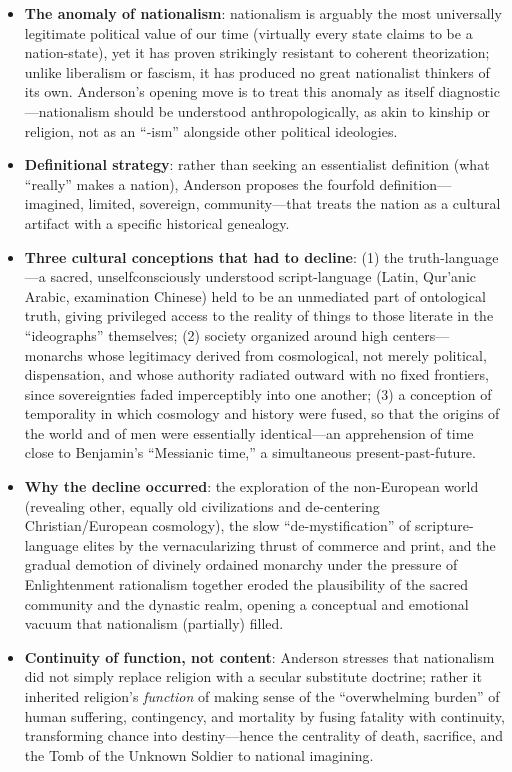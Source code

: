\documentclass[12pt]{article}
\begin{document}
\begin{itemize}[leftmargin=*, itemsep=4pt]
    \item \textbf{The anomaly of nationalism}: nationalism is arguably the most universally legitimate political value of our time (virtually every state claims to be a nation-state), yet it has proven strikingly resistant to coherent theorization; unlike liberalism or fascism, it has produced no great nationalist thinkers of its own. Anderson's opening move is to treat this anomaly as itself diagnostic---nationalism should be understood anthropologically, as akin to kinship or religion, not as an ``-ism'' alongside other political ideologies.
    \item \textbf{Definitional strategy}: rather than seeking an essentialist definition (what ``really'' makes a nation), Anderson proposes the fourfold definition---imagined, limited, sovereign, community---that treats the nation as a cultural artifact with a specific historical genealogy.
    \item \textbf{Three cultural conceptions that had to decline}: (1) the truth-language---a sacred, unselfconsciously understood script-language (Latin, Qur'anic Arabic, examination Chinese) held to be an unmediated part of ontological truth, giving privileged access to the reality of things to those literate in the ``ideographs'' themselves; (2) society organized around high centers---monarchs whose legitimacy derived from cosmological, not merely political, dispensation, and whose authority radiated outward with no fixed frontiers, since sovereignties faded imperceptibly into one another; (3) a conception of temporality in which cosmology and history were fused, so that the origins of the world and of men were essentially identical---an apprehension of time close to Benjamin's ``Messianic time,'' a simultaneous present-past-future.
    \item \textbf{Why the decline occurred}: the exploration of the non-European world (revealing other, equally old civilizations and de-centering Christian/European cosmology), the slow ``de-mystification'' of scripture-language elites by the vernacularizing thrust of commerce and print, and the gradual demotion of divinely ordained monarchy under the pressure of Enlightenment rationalism together eroded the plausibility of the sacred community and the dynastic realm, opening a conceptual and emotional vacuum that nationalism (partially) filled.
    \item \textbf{Continuity of function, not content}: Anderson stresses that nationalism did not simply replace religion with a secular substitute doctrine; rather it inherited religion's \emph{function} of making sense of the ``overwhelming burden'' of human suffering, contingency, and mortality by fusing fatality with continuity, transforming chance into destiny---hence the centrality of death, sacrifice, and the Tomb of the Unknown Soldier to national imagining.
\end{itemize}
\end{document}
